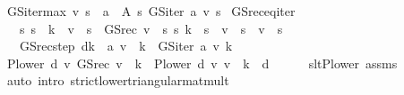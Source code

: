 \begin{isabellebody}
\ {\isachardoublequoteopen}GS{\isacharunderscore}{\kern0pt}iter{\isacharunderscore}{\kern0pt}max\ v\ s\ {\isacharequal}{\kern0pt}\ {\isacharparenleft}{\kern0pt}{\isasymSqunion}a\ {\isasymin}\ A\ s{\isachardot}{\kern0pt}\ GS{\isacharunderscore}{\kern0pt}iter\ a\ v\ s{\isacharparenright}{\kern0pt}{\isachardoublequoteclose}\isanewline
\isanewline
{}\isamarkupfalse%
\ GS{\isacharunderscore}{\kern0pt}rec{\isacharunderscore}{\kern0pt}eq{\isacharunderscore}{\kern0pt}iter{\isacharcolon}{\kern0pt}\isanewline
\ \ \ {\isachardoublequoteopen}{\isasymAnd}s{\isachardot}{\kern0pt}\ s\ {\isacharless}{\kern0pt}\ k\ {\isasymLongrightarrow}\ v{\isacharprime}{\kern0pt}\ {\isachardollar}{\kern0pt}\ s\ {\isacharequal}{\kern0pt}\ GS{\isacharunderscore}{\kern0pt}rec\ v\ {\isachardollar}{\kern0pt}\ s{\isachardoublequoteclose}\ {\isachardoublequoteopen}{\isasymAnd}s{\isachardot}{\kern0pt}\ k\ {\isasymle}\ s\ {\isasymLongrightarrow}\ v{\isacharprime}{\kern0pt}\ {\isachardollar}{\kern0pt}\ s\ {\isacharequal}{\kern0pt}\ v\ {\isachardollar}{\kern0pt}\ s{\isachardoublequoteclose}\isanewline
\ \ \ {\isachardoublequoteopen}GS{\isacharunderscore}{\kern0pt}rec{\isacharunderscore}{\kern0pt}step\ {\isacharparenleft}{\kern0pt}d{\isacharparenleft}{\kern0pt}k\ {\isacharcolon}{\kern0pt}{\isacharequal}{\kern0pt}\ a{\isacharparenright}{\kern0pt}{\isacharparenright}{\kern0pt}\ v\ {\isachardollar}{\kern0pt}\ k\ {\isacharequal}{\kern0pt}\ GS{\isacharunderscore}{\kern0pt}iter\ a\ v{\isacharprime}{\kern0pt}\ k{\isachardoublequoteclose}\isanewline
%
\isadelimproof
%
\endisadelimproof
%
\isatagproof
{}\isamarkupfalse%
\ {\isacharminus}{\kern0pt}\isanewline
\ \ \isamarkupfalse%
\ {\isachardoublequoteopen}{\isacharparenleft}{\kern0pt}P{\isacharunderscore}{\kern0pt}lower\ d\ {\isacharasterisk}{\kern0pt}v\ GS{\isacharunderscore}{\kern0pt}rec\ v{\isacharparenright}{\kern0pt}\ {\isachardollar}{\kern0pt}\ k\ {\isacharequal}{\kern0pt}\ {\isacharparenleft}{\kern0pt}P{\isacharunderscore}{\kern0pt}lower\ d\ {\isacharasterisk}{\kern0pt}v\ v{\isacharprime}{\kern0pt}{\isacharparenright}{\kern0pt}\ {\isachardollar}{\kern0pt}\ k{\isachardoublequoteclose}\ \ d\isanewline
\ \ \ \ \isamarkupfalse%
\ slt{\isacharunderscore}{\kern0pt}P{\isacharunderscore}{\kern0pt}lower\ assms\isanewline
\ \ \ \ \isamarkupfalse%
\ {\isacharparenleft}{\kern0pt}auto\ intro{\isacharbang}{\kern0pt}{\isacharcolon}{\kern0pt}\ strict{\isacharunderscore}{\kern0pt}lower{\isacharunderscore}{\kern0pt}triangular{\isacharunderscore}{\kern0pt}mat{\isacharunderscore}{\kern0pt}mult{\isacharparenright}{\kern0pt}\isanewline

\end{isabellebody}
